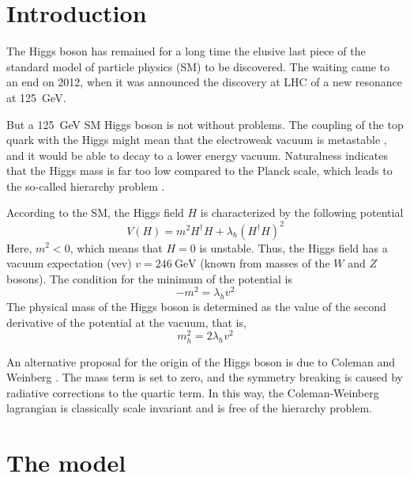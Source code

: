\documentclass[aps,prd,preprintnumbers,nofootinbibn,twocolumn]{revtex4}
\begin{document}
\vspace{5cm}




\newpage
\clearpage

\section{Introduction}
The Higgs boson has remained for a long time the elusive last piece of the standard model of particle physics (SM) to be discovered. The waiting came to an end on 2012, when it was announced the discovery at LHC \cite{Aad:2012tfa,Chatrchyan:2012xdj} of a new resonance at \SI{125}{\giga\electronvolt}.

But a \SI{125}{\giga\electronvolt} SM Higgs boson is not without problems. The coupling of the top quark with the Higgs might mean that the electroweak vacuum is metastable \cite{EliasMiro:2011aa}, and it would be able to decay to a lower energy vacuum. Naturalness indicates that the Higgs mass is far too low compared to the Planck scale, which leads to the so-called hierarchy problem \cite{Iso:2013aqa}. 


According to the SM, the Higgs field $H$ is characterized by the following potential
\begin{equation}
V(H) = m^2 H^\dagger H + \lambda_h (H^\dagger H)^2
\end{equation}
Here, $m^2 < 0$, which means that $H=0$ is unstable. Thus, the Higgs field has a vacuum expectation (vev) $v=\SI{246}{\giga\electronvolt}$ (known from masses of the $W$ and $Z$ bosons). The condition for the minimum of the potential is 
\begin{equation}
-m^2 = \lambda_h v^2
\end{equation}
The physical mass of the Higgs boson is determined as the value of the second derivative of the potential at the vacuum, that is, 
\begin{equation}
m_h^2 = 2 \lambda_h v^2
\end{equation}

An alternative proposal for the origin of the Higgs boson is due to Coleman and Weinberg \cite{Coleman:1973jx}. The mass term is set to zero, and the symmetry breaking is caused by radiative corrections to the quartic term. In this way, the Coleman-Weinberg lagrangian is classically scale invariant and is free of the hierarchy problem.

\section{The model} 
\end{document}
